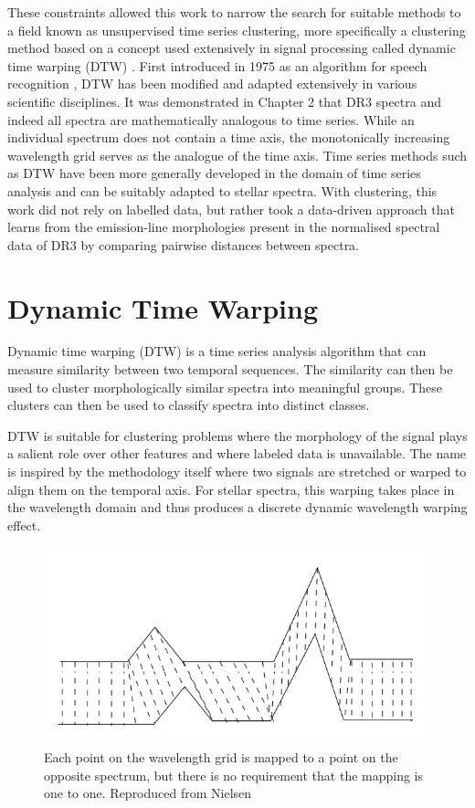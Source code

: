 These constraints allowed this work to narrow the search for suitable methods to a field known as unsupervised time series clustering, more specifically a clustering method based on a concept used extensively in signal processing called dynamic time warping (DTW) \cite{kruskal1983overview}. First introduced in 1975 as an algorithm for speech recognition \cite{itakura1975minimum}, DTW has been modified and adapted extensively in various scientific disciplines. It was demonstrated in Chapter 2 that DR3 spectra and indeed all spectra are mathematically analogous to time series. While an individual spectrum does not contain a time axis, the monotonically increasing wavelength grid serves as the analogue of the time axis. Time series methods such as DTW have been more generally developed in the domain of time series analysis \cite{nielsen2019practical} and can be suitably adapted to stellar spectra. With clustering, this work did not rely on labelled data, but rather took a data-driven approach that learns from the emission-line morphologies present in the normalised spectral data of DR3 by comparing pairwise distances between spectra.

\section{Dynamic Time Warping}

Dynamic time warping (DTW) is a time series analysis algorithm that can measure similarity between two temporal sequences. The similarity can then be used to cluster morphologically similar spectra into meaningful groups. These clusters can then be used to classify spectra into distinct classes. 

DTW is suitable for clustering problems where the morphology of the signal plays a salient role over other features \cite{nielsen2019practical} and where labeled data is unavailable. The name is inspired by the methodology itself where two signals are stretched or warped to align them on the temporal axis. For stellar spectra, this warping takes place in the wavelength domain and thus produces a discrete dynamic wavelength warping effect.

\begin{figure}[!htb]
\centering
\includegraphics[scale=1]{figures/Dynamic_time_warping.png}
\caption{Each point on the wavelength grid is mapped to a point on the opposite spectrum, but there is no requirement that the mapping is one to one. Reproduced from Nielsen \cite{nielsen2019practical}}
\end{figure}

